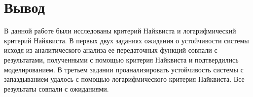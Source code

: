 
\FloatBarrier

\FloatBarrier


\FloatBarrier
\section{Вывод}
В данной работе были исследованы критерий Найквиста и логарифмический 
критерий Найквиста. В первых двух заданиях ожидания о устойчивости
системы исходя из аналитического анализа ее передаточных функций 
совпали с результатами, полученными с помощью критерия Найквиста и 
подтвердились моделированием. В третьем задании проанализировать 
устойчивость системы с запаздыванием удалось с помощью логарифмического
критерия Найквиста. Все результаты совпали с ожиданиями.